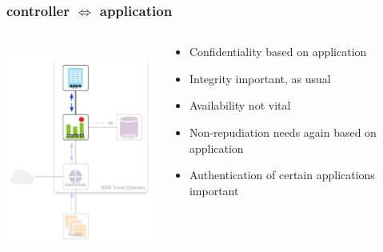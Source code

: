 \documentclass[t,handout]{beamer}
\begin{document}
\begin{frame}
\frametitle{controller $\Longleftrightarrow$  application}
\begin{columns}[T]
\includegraphics[height=2.75in]{ra-c-a}
\begin{beamerboxesrounded}[shadow]{}
\begin{itemize}
\item {\color{orange} Confidentiality based on application}
\item {\color{red} Integrity important, as usual}
\item {\color{green} Availability not vital} 
\item {\color{green} Non-repudiation needs again based on application}
\item {\color{red} Authentication of certain applications important}
\end{itemize}
\end{beamerboxesrounded}
\end{columns}
\end{frame}
\end{document}
